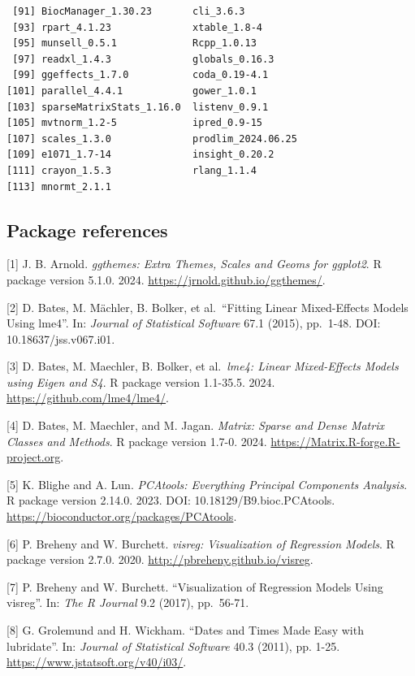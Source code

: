 \documentclass[
  letterpaper,
  DIV=11,
  numbers=noendperiod]{scrreprt}
\begin{document}
\begin{verbatim}
 [91] BiocManager_1.30.23       cli_3.6.3                
 [93] rpart_4.1.23              xtable_1.8-4             
 [95] munsell_0.5.1             Rcpp_1.0.13              
 [97] readxl_1.4.3              globals_0.16.3           
 [99] ggeffects_1.7.0           coda_0.19-4.1            
[101] parallel_4.4.1            gower_1.0.1              
[103] sparseMatrixStats_1.16.0  listenv_0.9.1            
[105] mvtnorm_1.2-5             ipred_0.9-15             
[107] scales_1.3.0              prodlim_2024.06.25       
[109] e1071_1.7-14              insight_0.20.2           
[111] crayon_1.5.3              rlang_1.1.4              
[113] mnormt_2.1.1             
\end{verbatim}

\subsection{Package references}\label{package-references-2}

{[}1{]} J. B. Arnold. \emph{ggthemes: Extra Themes, Scales and Geoms for
ggplot2}. R package version 5.1.0. 2024.
\url{https://jrnold.github.io/ggthemes/}.

{[}2{]} D. Bates, M. Mächler, B. Bolker, et al.~``Fitting Linear
Mixed-Effects Models Using lme4''. In: \emph{Journal of Statistical
Software} 67.1 (2015), pp.~1-48. DOI: 10.18637/jss.v067.i01.

{[}3{]} D. Bates, M. Maechler, B. Bolker, et al.~\emph{lme4: Linear
Mixed-Effects Models using Eigen and S4}. R package version 1.1-35.5.
2024. \url{https://github.com/lme4/lme4/}.

{[}4{]} D. Bates, M. Maechler, and M. Jagan. \emph{Matrix: Sparse and
Dense Matrix Classes and Methods}. R package version 1.7-0. 2024.
\url{https://Matrix.R-forge.R-project.org}.

{[}5{]} K. Blighe and A. Lun. \emph{PCAtools: Everything Principal
Components Analysis}. R package version 2.14.0. 2023. DOI:
10.18129/B9.bioc.PCAtools.
\url{https://bioconductor.org/packages/PCAtools}.

{[}6{]} P. Breheny and W. Burchett. \emph{visreg: Visualization of
Regression Models}. R package version 2.7.0. 2020.
\url{http://pbreheny.github.io/visreg}.

{[}7{]} P. Breheny and W. Burchett. ``Visualization of Regression Models
Using visreg''. In: \emph{The R Journal} 9.2 (2017), pp.~56-71.

{[}8{]} G. Grolemund and H. Wickham. ``Dates and Times Made Easy with
lubridate''. In: \emph{Journal of Statistical Software} 40.3 (2011), pp.
1-25. \url{https://www.jstatsoft.org/v40/i03/}.
\end{document}
